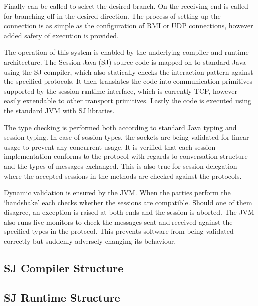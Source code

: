 Finally  can be called to select the desired branch. On the receiving end 
 is called for branching off in the desired direction. The process of setting up the connection is as simple as the configuration of RMI or UDP connections, however added safety of execution is provided.

The operation of this system is enabled by the underlying compiler and runtime architecture. The Session Java (SJ) source code is mapped on to standard Java using the SJ compiler, which also statically checks the interaction pattern against the specified protocols. It then translates the code into communication primitives supported by the session runtime interface, which is currently TCP, however easily extendable to other transport primitives. Lastly the code is executed using the standard JVM with SJ libraries.

The type checking is performed both according to standard Java typing and session typing. In case of session types, the sockets are being validated for linear usage to prevent any concurrent usage. It is verified that each session implementation conforms to the protocol with regards to conversation structure and the types of messages exchanged. This is also true for session delegation where the accepted sessions in the methods are checked against the protocols.

Dynamic validation is ensured by the JVM. When the parties perform the `handshake' each checks whether the sessions are compatible. Should one of them disagree, an exception is raised at both ends and the session is aborted. The JVM also runs live monitors to check the messages sent and received against the specified types in the protocol. This prevents software from being validated correctly but suddenly adversely changing its behaviour.

\subsection{SJ Compiler Structure}
\label{subsec:sjcomp}


\subsection{SJ Runtime Structure}
\label{subsec:sjrun}



